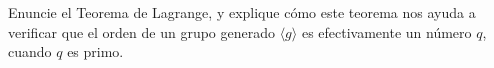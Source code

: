 Enuncie el Teorema de Lagrange, y explique cómo este teorema nos ayuda
a verificar que el orden de un grupo generado $\langle g\rangle$ es
efectivamente un número $q$, cuando $q$ es primo.

